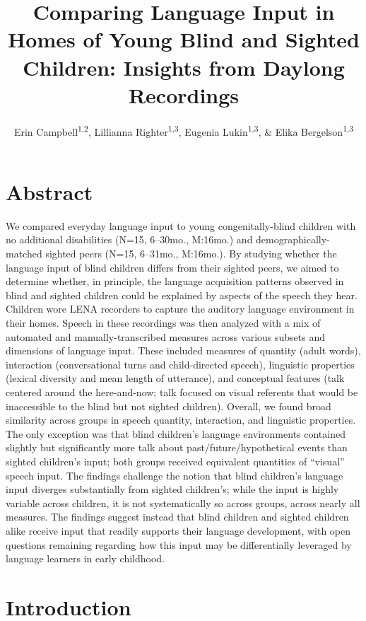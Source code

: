 \documentclass[
  man,floatsintext]{apa6}
\title{Comparing Language Input in Homes of Young Blind and Sighted Children: Insights from Daylong Recordings}
\author{Erin Campbell\textsuperscript{1,2}, Lillianna Righter\textsuperscript{1,3}, Eugenia Lukin\textsuperscript{1,3}, \& Elika Bergelson\textsuperscript{1,3}}
\date{}
\affiliation{\vspace{0.5cm}\textsuperscript{1} Department of Psychology \& Neuroscience, Duke University, Durham, NC\\\textsuperscript{2} Wheelock College of Education \& Human Development, Boston University, Boston, MA\\\textsuperscript{3} Department of Psychology, Harvard University, Cambridge, MA}
\begin{document}
\maketitle

\hypertarget{abstract}{%
\section{Abstract}\label{abstract}}

We compared everyday language input to young congenitally-blind children with no additional disabilities (N=15, 6--30mo., M:16mo.) and demographically-matched sighted peers (N=15, 6--31mo., M:16mo.). By studying whether the language input of blind children differs from their sighted peers, we aimed to determine whether, in principle, the language acquisition patterns observed in blind and sighted children could be explained by aspects of the speech they hear. Children wore LENA recorders to capture the auditory language environment in their homes. Speech in these recordings was then analyzed with a mix of automated and manually-transcribed measures across various subsets and dimensions of language input. These included measures of quantity (adult words), interaction (conversational turns and child-directed speech), linguistic properties (lexical diversity and mean length of utterance), and conceptual features (talk centered around the here-and-now; talk focused on visual referents that would be inaccessible to the blind but not sighted children). Overall, we found broad similarity across groups in speech quantity, interaction, and linguistic properties. The only exception was that blind children's language environments contained slightly but significantly more talk about past/future/hypothetical events than sighted children's input; both groups received equivalent quantities of ``visual'' speech input. The findings challenge the notion that blind children's language input diverges substantially from sighted children's; while the input is highly variable across children, it is not systematically so across groups, across nearly all measures. The findings suggest instead that blind children and sighted children alike receive input that readily supports their language development, with open questions remaining regarding how this input may be differentially leveraged by language learners in early childhood.

\hypertarget{introduction}{%
\section{Introduction}\label{introduction}}
\end{document}
